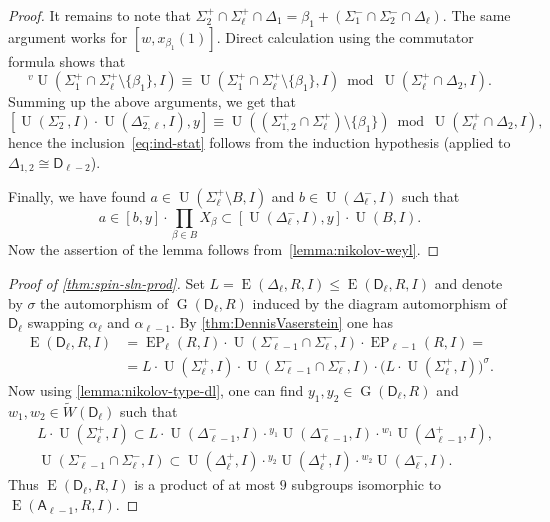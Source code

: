 \documentclass[11pt]{amsart}
\theoremstyle{plain}
\numberwithin{equation}{section}
\numberwithin{lemma}{section}
\theoremstyle{definition}
\theoremstyle{remark}
\DeclareMathOperator{\G}{G}
\DeclareMathOperator{\E}{E}
\DeclareMathOperator{\EP}{EP}
\DeclareMathOperator{\U}{U}
\newcommand{\rA}{\mathsf{A}}
\newcommand{\rD}{\mathsf{D}}
\begin{document}
\begin{proof}
It remains to note that $\Sigma_2^+ \cap \Sigma_\ell^+ \cap \Delta_1 = \beta_1 + (\Sigma_1^- \cap \Sigma_2^- \cap \Delta_\ell)$. The same argument works for $[w, x_{\beta_1}(1)]$.
Direct calculation using the commutator formula shows that
\[ {}^v\!\U(\Sigma_1^+\cap\Sigma_\ell^+\setminus\{\beta_1\}, I) \equiv \U(\Sigma_1^+\cap\Sigma_\ell^+\setminus\{\beta_1\}, I) \bmod \U(\Sigma_\ell^+\cap\Delta_2, I). \]
Summing up the above arguments, we get that
\[ [\U(\Sigma_2^-, I)\cdot\U(\Delta_{2, \ell}^-, I), y] \equiv \U((\Sigma_{1, 2}^+\cap\Sigma_\ell^+)\setminus\{\beta_1\}) \bmod \U(\Sigma_\ell^+\cap\Delta_2, I), \]
hence the inclusion~\eqref{eq:ind-stat} follows from the induction hypothesis (applied to $\Delta_{1, 2} \cong \rD_{\ell-2}$). 

Finally, we have found $a\in\U(\Sigma_\ell^+\setminus B, I)$ and $b\in\U(\Delta_\ell^-, I)$
such that $$a\in[b, y]\cdot\prod_{\beta\in B}X_\beta\subset[\U(\Delta_\ell^-, I), y]\cdot\U(B, I).$$
Now the assertion of the lemma follows from~\cref{lemma:nikolov-weyl}.
\end{proof}

\begin{proof} [Proof of \cref{thm:spin-sln-prod}]
Set $L = \E(\Delta_\ell, R, I) \leq \E(\rD_\ell, R, I)$ and denote by $\sigma$ the automorphism of $\G(\rD_\ell, R)$ induced by the 
diagram automorphism of $\rD_\ell$ swapping $\alpha_\ell$ and $\alpha_{\ell-1}$.
By \cref{thm:DennisVaserstein} one has
\begin{align*}
\E(\rD_\ell, R, I) & = \EP_{\ell}(R, I)\cdot\U(\Sigma_{\ell-1}^- \cap \Sigma_{\ell}^-, I)\cdot\EP_{\ell-1}(R, I) = \\
& = L \cdot\U(\Sigma_\ell^+, I)\cdot\U(\Sigma_{\ell-1}^- \cap \Sigma_{\ell}^-, I)\cdot \big(L \cdot \U(\Sigma_\ell^+, I) \big)^\sigma\!.
\end{align*}  
Now using \cref{lemma:nikolov-type-dl}, one can find $y_1, y_2\in\G(\rD_\ell, R)$ and $w_1, w_2\in\widetilde{W}(\rD_\ell)$ such that
\begin{align*} & L \cdot \U(\Sigma_\ell^+, I) \subset L \cdot \U(\Delta_{\ell-1}^-, I) \cdot {}^{y_1}\!\U(\Delta_{\ell-1}^-, I) \cdot {}^{w_1}\!\U(\Delta_{\ell-1}^+, I), \\
& \U(\Sigma_{\ell-1}^-\cap\Sigma_\ell^-, I) \subset \U(\Delta_\ell^+, I) \cdot {}^{y_2}\!\U(\Delta_\ell^+, I) \cdot {}^{w_2}\!\U(\Delta_\ell^-, I). \end{align*} 
Thus $\E(\rD_\ell, R, I)$ is a product of at most $9$ subgroups isomorphic to $\E(\rA_{\ell-1}, R, I)$. \end{proof}
\end{document}
